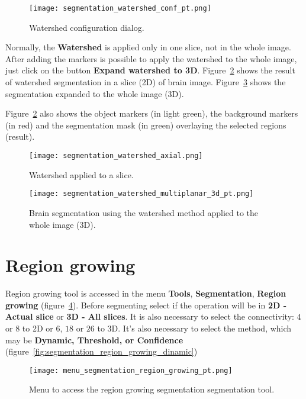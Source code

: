 \begin{figure}[!htb]
    \centering
    \texttt{[image: segmentation\_watershed\_conf\_pt.png]}
    \caption{Watershed configuration dialog.}
    \label{fig:watershed_janela_conf}
\end{figure}

Normally, the \textbf{Watershed} is applied only in one slice, not in the whole image. After adding the markers is possible to apply the watershed to the whole image, just click on the button \textbf{Expand watershed to 3D}. Figure~\ref{fig:watershed_2d} shows the result of watershed segmentation in a slice (2D) of brain image. Figure~\ref{fig:watershed_3d} shows the segmentation expanded to the whole image (3D).

Figure~\ref{fig:watershed_2d} also shows the object markers (in light green), the background markers (in red) and the segmentation mask (in green) overlaying the selected regions (result).

\begin{figure}[!htb]
\centering
\texttt{[image: segmentation\_watershed\_axial.png]}
\caption{Watershed applied to a slice.}
\label{fig:watershed_2d}
\end{figure}

\begin{figure}[!htb]
\centering
\texttt{[image: segmentation\_watershed\_multiplanar\_3d\_pt.png]}
\caption{Brain segmentation using the watershed method applied to the whole image (3D).}
\label{fig:watershed_3d}
\end{figure}

\section{Region growing}

Region growing tool is accessed in the menu \textbf{Tools}, \textbf{Segmentation}, \textbf{Region growing} (figure~\ref{fig:menu_segmentation_region_growing}). Before segmenting select if the operation will be in \textbf{2D - Actual slice} or \textbf{3D - All slices}. It is also necessary to select the connectivity: $4$ or $8$ to 2D or $6$, $18$ or $26$ to 3D. It's also necessary to select the method, which may be \textbf{Dynamic, Threshold, or Confidence} (figure~\ref{fig:segmentation_region_growing_dinamic})

\begin{figure}[!htb]
    \centering
    \texttt{[image: menu\_segmentation\_region\_growing\_pt.png]}
    \caption{Menu to access the region growing segmentation segmentation tool.}
    \label{fig:menu_segmentation_region_growing}
\end{figure}

